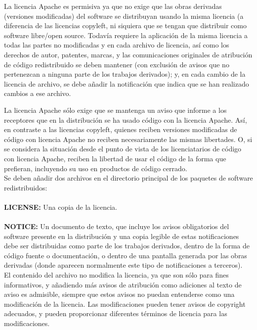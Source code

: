La licencia Apache es permisiva ya que no exige que las obras derivadas (versiones modificadas) del software se distribuyan usando la misma licencia (a diferencia de las licencias copyleft, ni siquiera que se tengan que distribuir como software libre/open source. Todavía requiere la aplicación de la misma licencia a todas las partes no modificadas y en cada archivo de licencia, así como los derechos de autor, patentes, marcas, y las comunicaciones originales de atribución de código redistribuido se deben mantener (con exclusión de avisos que no pertenezcan a ninguna parte de los trabajos derivados); y, en cada cambio de la licencia de archivo, se debe añadir la notificación que indica que se han realizado cambios a ese archivo.


La licencia Apache sólo exige que se mantenga un aviso que informe a los receptores que en la distribución se ha usado código con la licencia Apache. Así, en contraste a las licencias copyleft, quienes reciben versiones modificadas de código con licencia Apache no reciben necesariamente las mismas libertades. O, si se considera la situación desde el punto de vista de los licenciatarios de código con licencia Apache, reciben la libertad de usar el código de la forma que prefieran, incluyendo su uso en productos de código cerrado.\\

Se deben añadir dos archivos en el directorio principal de los paquetes de software redistribuidos:\\\\
\textbf{LICENSE:}
Una copia de la licencia.\\\\
\textbf{NOTICE:}
Un documento de texto, que incluye los avisos obligatorios del software presente en la distribución y una copia legible de estas notificaciones debe ser distribuidas como parte de los trabajos derivados, dentro de la forma de código fuente o documentación, o dentro de una pantalla generada por las obras derivadas (donde aparecen normalmente este tipo de notificaciones a terceros).\\

El contenido del archivo no modifica la licencia, ya que son sólo para fines informativos, y añadiendo más avisos de atribución como adiciones al texto de aviso es admisible, siempre que estos avisos no puedan entenderse como una modificación de la licencia. Las modificaciones pueden tener avisos de copyright adecuados, y pueden proporcionar diferentes términos de licencia para las modificaciones.\\

